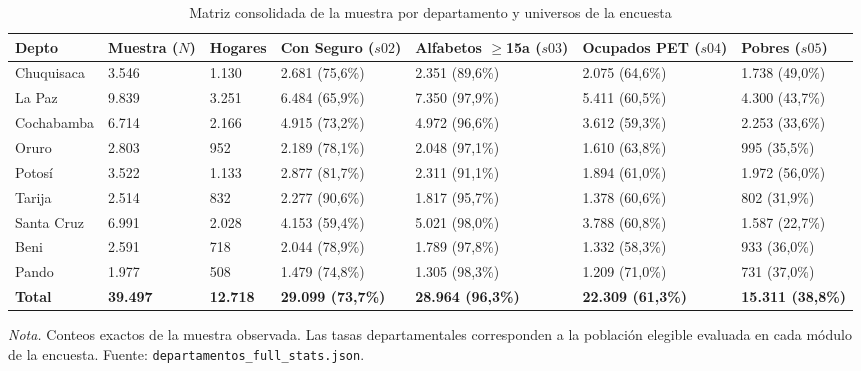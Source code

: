 \begin{table}[htbp]
\centering
\caption{Matriz consolidada de la muestra por departamento y universos de la encuesta}
\label{tab:matriz_departamental}
\begin{tabularx}{\textwidth}{>{\raggedright\arraybackslash\small}p{2.1cm}>{\raggedleft\arraybackslash\small}p{1.35cm}>{\raggedleft\arraybackslash\small}p{1.35cm}>{\raggedleft\arraybackslash\small}p{1.75cm}>{\raggedleft\arraybackslash\small}p{1.85cm}>{\raggedleft\arraybackslash\small}p{1.65cm}>{\raggedleft\arraybackslash\small}X}
\toprule
\textbf{Depto} & \textbf{Muestra ($N$)} & \textbf{Hogares} & \textbf{Con Seguro ($s02$)} & \textbf{Alfabetos $\ge$15a ($s03$)} & \textbf{Ocupados PET ($s04$)} & \textbf{Pobres ($s05$)} \\
\midrule
Chuquisaca & 3.546 & 1.130 & 2.681 (75,6\%) & 2.351 (89,6\%) & 2.075 (64,6\%) & 1.738 (49,0\%) \\
La Paz & 9.839 & 3.251 & 6.484 (65,9\%) & 7.350 (97,9\%) & 5.411 (60,5\%) & 4.300 (43,7\%) \\
Cochabamba & 6.714 & 2.166 & 4.915 (73,2\%) & 4.972 (96,6\%) & 3.612 (59,3\%) & 2.253 (33,6\%) \\
Oruro & 2.803 & 952 & 2.189 (78,1\%) & 2.048 (97,1\%) & 1.610 (63,8\%) & 995 (35,5\%) \\
Potosí & 3.522 & 1.133 & 2.877 (81,7\%) & 2.311 (91,1\%) & 1.894 (61,0\%) & 1.972 (56,0\%) \\
Tarija & 2.514 & 832 & 2.277 (90,6\%) & 1.817 (95,7\%) & 1.378 (60,6\%) & 802 (31,9\%) \\
Santa Cruz & 6.991 & 2.028 & 4.153 (59,4\%) & 5.021 (98,0\%) & 3.788 (60,8\%) & 1.587 (22,7\%) \\
Beni & 2.591 & 718 & 2.044 (78,9\%) & 1.789 (97,8\%) & 1.332 (58,3\%) & 933 (36,0\%) \\
Pando & 1.977 & 508 & 1.479 (74,8\%) & 1.305 (98,3\%) & 1.209 (71,0\%) & 731 (37,0\%) \\
\midrule
\textbf{Total} & \textbf{39.497} & \textbf{12.718} & \textbf{29.099 (73,7\%)} & \textbf{28.964 (96,3\%)} & \textbf{22.309 (61,3\%)} & \textbf{15.311 (38,8\%)} \\
\bottomrule
\end{tabularx}
\par\vspace{3pt}\parbox{\textwidth}{\footnotesize\textit{Nota.} Conteos exactos de la muestra observada. Las tasas departamentales corresponden a la población elegible evaluada en cada módulo de la encuesta. Fuente: \texttt{departamentos\_full\_stats.json}.}
\end{table}

